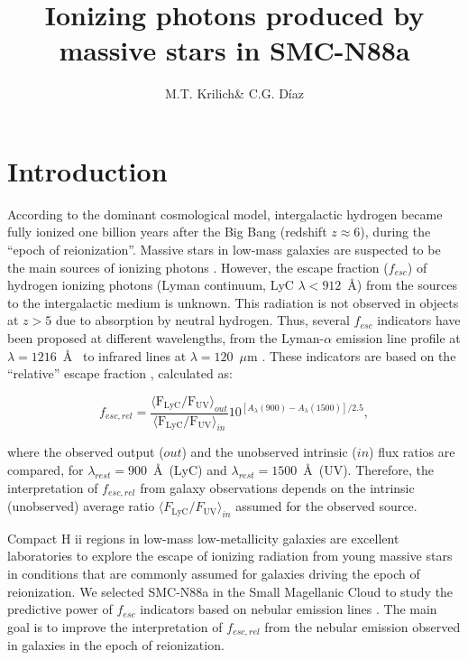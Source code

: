 \documentclass[baaa]{baaa}
\title{Ionizing photons produced by massive stars in SMC-N88a}
\author{
M.T. Krilich\inst{1}\&
C.G. D\'iaz\inst{2,3}
}
\institute{
Facultad de Matemática, Astronomía, Física y Computación, UNC, Argentina
\and
Observatorio Astron\'omico de C\'ordoba, UNC, Argentina
\and
Consejo Nacional de Investigaciones Cient\'ificas y T\'ecnicas, Argentina
}
\begin{document}
\maketitle

\section{Introduction}\label{S_intro}

According to the dominant cosmological model, intergalactic hydrogen became fully ionized one billion years after the Big Bang (redshift $z\approx6$), during the ``epoch of reionization''. 
Massive stars in low-mass galaxies are suspected to be the main sources of ionizing photons 
\citep[e.g.,][]{Robertson2013,henkel2022}. 
However, the escape fraction ($f_{esc}$) of hydrogen ionizing photons (Lyman continuum, LyC $\lambda< 912$~\AA) from the sources to the intergalactic medium is unknown. This radiation is not observed in objects at $z > 5$ due to absorption by neutral hydrogen. Thus, several $f_{esc}$ indicators have been proposed at different wavelengths, from the Lyman-$\alpha$ emission line profile at $\lambda = 1216$~\AA\ \citep{Verhamme2015,Gazagnes2020} to infrared lines at $\lambda = 120$~$\mu $m \citep{Ramambason2022}. 
These indicators are based on the ``relative'' escape fraction \citep{Steidel2001,Steidel2018}, calculated as:


\begin{equation}
f_{esc,rel} = \frac{\langle
\mathrm{F_{LyC}/F_{UV}}\rangle_{out}}{\langle \mathrm{F_{LyC}/F_{UV}}\rangle_{in}}10^{[A_{\lambda}(900)-A_{\lambda}(1500)]/2.5},
\end{equation}

\vspace{0.2 cm}
\noindent where the observed output ($out$) and the unobserved intrinsic ($in$) flux ratios are compared, for $\lambda_{rest}= 900$~\AA\ (LyC) and $\lambda_{rest}= 1500$~\AA\ (UV). 
Therefore, the interpretation of $f_{esc,rel}$ from galaxy observations depends on the intrinsic (unobserved) average ratio $\langle F_{\mathrm{LyC}}/F_{\mathrm{UV}}\rangle_{in}$ assumed for the observed source. 

Compact H {\sc ii} regions in low-mass low-metallicity galaxies are
excellent laboratories to explore the escape of
ionizing radiation from young massive stars
in conditions that are commonly assumed for galaxies 
driving the epoch of reionization.
We selected SMC-N88a in the Small Magellanic Cloud to study 
the predictive power of $f_{esc}$ indicators based on nebular emission lines \citep{diaz2023}. The main goal is to improve
the interpretation of $f_{esc,rel}$ from the nebular emission observed in galaxies in the epoch of reionization. 
\end{document}
